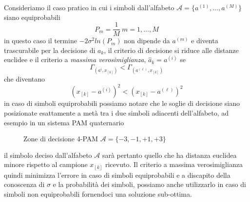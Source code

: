             Consideriamo il caso pratico in cui i simboli dall'alfabeto $\mathcal{A} = \{a^{(1)},\dots,a^{(M)}\}$ siano
            equiprobabili
            \[
                P_m=\frac{1}{M}\ m=1,\dots,M  
            \]
            in questo caso il termine $-2\sigma^2ln(P_m)$ non dipende da $a^{(m)}$ e diventa trascurabile per la decisione
            di $a_k$, il criterio di decisione si riduce alle distanze euclidee e il criterio a \emph{massima verosimiglianza}, $\hat{a}_k=a^{(i)}$ se
            \[
                \Gamma_{(a^{i},x_{[k]})} < \Gamma_{(a^{(\ell)},x_{[k]})}                    
            \]
            che diventano 
            \[
                \left(x_{[k]}-a^{(i)}\right)^2<\left(x_{[k]}-a^{(\ell)}\right)^2  
            \]
            in caso di simboli equiprobabili possiamo notare che le soglie di decisione siano posizionate esattamente a 
            metà tra i due simboli adiacenti dell'alfabeto, ad esempio in un sistema PAM quaternario
            \begin{figure}[H]
                \centering
                \caption{Zone di decisione 4-PAM $\mathcal{A} = \{-3,-1,+1,+3\}$}
            \end{figure}
            il simbolo deciso dall'alfabeto $\mathcal{A}$ sarà pertanto quello che ha distanza euclidea minore rispetto al 
            campione $x_{[k]}$ ricevuto. Il criterio a massima verosimiglianza quindi minimizza l'errore in caso 
            di simboli equiprobabili e a discapito della conoscenza di $\sigma$ e la probabilità dei simboli,
            possiamo anche utilizzarlo in caso di simboli non equiprobabili fornendoci una soluzione sub-ottima. 
